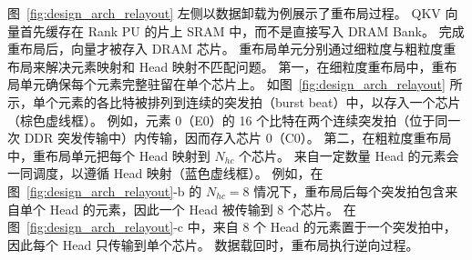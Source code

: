 图~\ref{fig:design_arch_relayout} 左侧以数据卸载为例展示了重布局过程。
QKV 向量首先缓存在 Rank PU 的片上 SRAM 中，而不是直接写入 DRAM Bank。
完成重布局后，向量才被存入 DRAM 芯片。
重布局单元分别通过细粒度与粗粒度重布局来解决元素映射和 Head 映射不匹配问题。
第一，在细粒度重布局中，重布局单元确保每个元素完整驻留在单个芯片上。
如图~\ref{fig:design_arch_relayout} 所示，单个元素的各比特被排列到连续的突发拍（burst beat）中，以存入一个芯片（棕色虚线框）。
例如，元素 0（E0）的 16 个比特在两个连续突发拍（位于同一次 DDR 突发传输中）内传输，因而存入芯片 0（C0）。
第二，在粗粒度重布局中，重布局单元把每个 Head 映射到 $N_{hc}$ 个芯片。
来自一定数量 Head 的元素会一同调度，以遵循 Head 映射（蓝色虚线框）。
例如，在图~\ref{fig:design_arch_relayout}-b 的 $N_{hc}=8$ 情况下，重布局后每个突发拍包含来自单个 Head 的元素，因此一个 Head 被传输到 8 个芯片。
在图~\ref{fig:design_arch_relayout}-c 中，来自 8 个 Head 的元素置于一个突发拍中，因此每个 Head 只传输到单个芯片。
数据载回时，重布局执行逆向过程。
